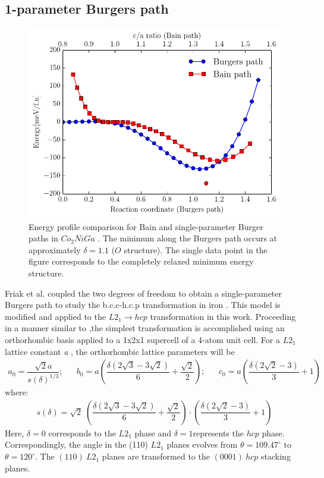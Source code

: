 \documentclass[%
preprint,
 amsmath,amssymb,
 aps,
prb,
showkeys,
]{revtex4-1}
\begin{document}
\subsection{1-parameter Burgers path}
\label{Sec:1D_formalism} 

\begin{figure}[htp!]
\includegraphics[scale=1.0]{figure_1}
\caption{ Energy profile comparison for Bain and single-parameter Burger  paths in  $Co_2NiGa$ . The minimum along the Burgers path occurs at approximately $\delta =1.1$ ($O$ structure). The single data point in the figure corresponds to the completely relaxed minimum energy structure.}  
\label{burger_bain}
\end{figure}

Friak et al. \cite{friak2008ab} coupled the two degrees of freedom to obtain a single-parameter Burgers path to study the b.c.c-h.c.p transformation in iron \cite{vsob1998ab,vsob1999proceedings,friak2008ab}. This model is modified and applied to the $L2_1 \rightarrow hcp$ transformation in this work.
Proceeding in a manner similar to \cite{friak2008ab},the simplest transformation is accomplished using  an orthorhombic basis applied to a 1x2x1 supercell of a 4-atom unit cell. For a $L2_{1}$ lattice constant \textit{a} , the orthorhombic lattice parameters will be
\begin{align}
 a_0 = \dfrac{\sqrt{2}a}{{s(\delta)}^{1/3}}; \ \ \ \ \ \ \;
 b_0 = a\left(\dfrac{\delta(2\sqrt{3} - 3\sqrt{2})}{6} +\dfrac{ \sqrt{2}} {2} \right); \ \ \ \ \ \ \;
 c_0 = a\left( \dfrac{\delta (2\sqrt{2} - 3)}{3} + 1\right)
\end{align}
where:
\begin{align}
s(\delta) = \sqrt{2} \;\left( \dfrac{\delta(2\sqrt{3} - 3\sqrt{2})}{6}  + \dfrac{\sqrt{2}}{2}\right)\cdot \left( \dfrac{\delta(2\sqrt{2} - 3)} {3} + 1\right)
\end{align}
Here, $\delta =0 $ corresponds to the $L2_1$ phase and $\delta =1$represents the $hcp$ phase. 
Correspondingly, the angle in the (110) $L2_1$ planes evolves from $\theta=109.47 ^\circ $ to $\theta=120 ^\circ $. The $(110) \ L2_1$ planes are transformed to the $(0001) \ hcp $ stacking  planes. 
\end{document}
